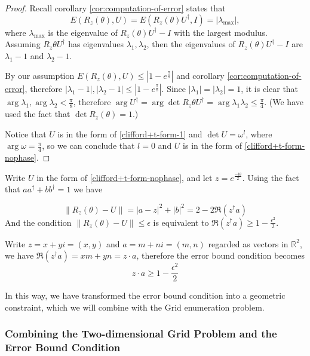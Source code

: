 \begin{proof}
	Recall corollary \ref{cor:computation-of-error} states that
	$$
	E(R_z(\theta), U) = E(R_z(\theta) U^\dagger, I) = |\lambda_{\max}|,
	$$
	where $\lambda_{\max}$ is the eigenvalue of $R_z(\theta) U^\dagger - I$ with the largest modulus.
	Assuming $R_z{\theta} U^\dagger$ has eigenvalues $\lambda_1, \lambda_2$, then the eigenvalues of $R_z(\theta) U^\dagger - I$ are $\lambda_1 - 1$ and $\lambda_2 - 1$.

	By our assumption $E(R_z(\theta), U) \leq |1 - e^{\frac{\pi}{8}}|$ and corollary \ref{cor:computation-of-error}, therefore $|\lambda_1 - 1|, |\lambda_2 - 1| \leq |1-e^{\frac{\pi}{8}}|$. 
	Since $|\lambda_1| = |\lambda_2| = 1$, it is clear that $\arg \lambda_1 , \arg \lambda_2 < \frac{\pi}{8}$, therefore $\arg U^\dagger = \arg \det R_z{\theta} U^\dagger = \arg \lambda_1 \lambda_2  \leq \frac{\pi}{4}$. (We have used the fact that $\det R_z(\theta) = 1$.)

	Notice that $U$ is in the form of \ref{clifford+t-form-1} and $\det U = \omega^l$, where $\arg \omega = \frac{\pi}{4}$, so we can conclude that $l = 0$ and $U$ is in the form of \ref{clifford+t-form-nophase}.

\end{proof}

Write $U$ in the form of \ref{clifford+t-form-nophase}, and let $z = e^{\frac{-i \theta}{2}}$. 
Using the fact that $aa^\dagger + b b^\dagger = 1$ we have 

$$
\|R_z(\theta) - U \| = |a - z|^2 + |b|^2 = 2 - 2 \Re(z^\dagger a) 
$$
And the condition $\|R_z(\theta) - U\| \leq \epsilon$ is equivalent to $\Re(z^\dagger a) \geq 1 - \frac{\epsilon^2}{2}$.

Write $z = x + yi = (x, y)$ and $a = m + ni  =(m, n)$ regarded as vectors in $\mathbb{R}^2$, we have $\Re(z^\dagger a) = xm + yn = z \cdot a$, therefore the error bound condition becomes 
\begin{equation}\label{error-bound-2}
z \cdot a \geq 1 - \frac{\epsilon^2}{2}
\end{equation}

In this way, we have transformed the error bound condition into a geometric constraint, which we will combine with the Grid enumeration problem.

\subsubsection{Combining the Two-dimensional Grid Problem and the Error Bound Condition}

